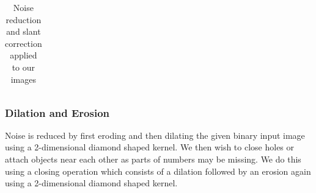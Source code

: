 \documentclass[%
        compressed,
        final,
        notitlepage,
        narroweqnarray,
        inline,
        twoside,
        ]{ieee}
\begin{document}
\begin{table}
\begin{tabular}{|c|c|}
        \hline
    \end{tabular}
    \label{tab:noise_reduction}
    \caption{Noise reduction and slant correction applied to our images}
\end{table}

\subsubsection{Dilation and Erosion}

Noise is reduced by first eroding and then dilating the given binary input image
using a 2-dimensional diamond shaped kernel. We then wish to close holes or
attach objects near each other
as parts of numbers may be missing. We do this using a closing operation which
consists of a dilation followed by an erosion again using a 2-dimensional diamond shaped kernel.
\end{document}
